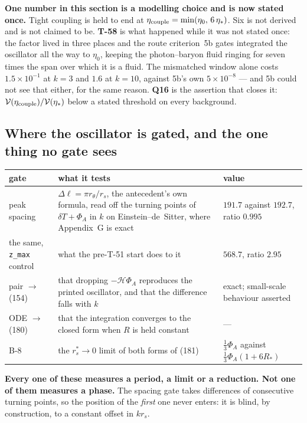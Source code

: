 \textbf{One number in this section is a modelling choice and is now stated
once.} Tight coupling is held to end at
$\eta_{\rm couple}=\min(\eta_0,\,6\,\eta_*)$. Six is not derived and is not
claimed to be. \textbf{T-58} is what happened while it was not stated once: the
factor lived in three places and the route criterion~5b gates integrated the
oscillator all the way to $\eta_0$, keeping the photon--baryon fluid ringing for
seven times the span over which it is a fluid. The mismatched window alone
costs $1.5\times10^{-1}$ at $k=3$ and $1.6$ at $k=10$, against 5b's own
$5\times10^{-8}$ --- and 5b could not see that either, for the same reason.
\textbf{Q16} is the assertion that closes it: $\mathcal V(\eta_{\rm
couple})/\mathcal V(\eta_*)$ below a stated threshold on every background.

\subsection{Where the oscillator is gated, and the one thing no gate sees}

\begin{center}\small
\begin{tabularx}{\textwidth}{@{}l >{\raggedright\arraybackslash}X l@{}}
\toprule
\textbf{gate} & \textbf{what it tests} & \textbf{value} \\
\midrule
peak spacing & $\Delta\ell=\pi r_\theta/r_s$, the antecedent's own formula,
  read off the turning points of $\delta T+\Phi_A$ in $k$ on
  Einstein--de~Sitter, where Appendix~G is exact & $191.7$ against $192.7$,
  ratio $\mathbf{0.995}$ \\
the same, \texttt{z\_max} control & what the pre-T-51 start does to it &
  $568.7$, ratio $2.95$ \\
pair $\to$ (154) & that dropping $-\mathcal H\Phi_A$ reproduces the printed
  oscillator, and that the difference falls with $k$ & exact; small-scale
  behaviour asserted \\
ODE $\to$ (180) & that the integration converges to the closed form when $R$
  is held constant & --- \\
B-8 & the $r_s^*\to0$ limit of both forms of (181) & $\tfrac13\Phi_A$ against
  $\tfrac13\Phi_A(1+6R_*)$ \\
\bottomrule
\end{tabularx}
\end{center}

\noindent
\textbf{Every one of these measures a period, a limit or a reduction. Not one
of them measures a phase.} The spacing gate takes differences of consecutive
turning points, so the position of the \emph{first} one never enters: it is
blind, by construction, to a constant offset in $kr_s$.


